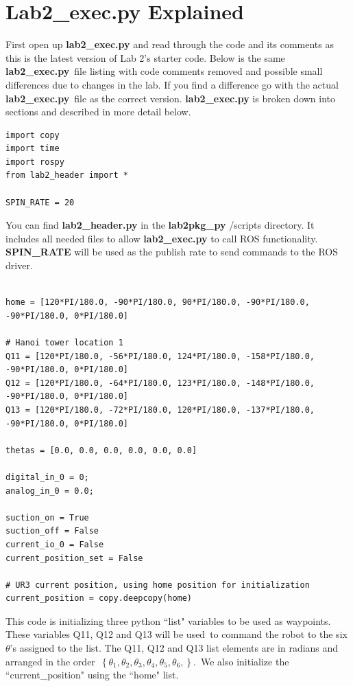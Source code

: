 \section{Lab2\_exec.py Explained}
First open up \textbf{lab2\_exec.py} and read through the code and its comments as this is the latest version of Lab 2's starter code. Below is the same \textbf{lab2\_exec.py}\
file listing with code comments removed and possible small differences due to changes in the lab.  If you find a difference go with the actual \textbf{lab2\_exec.py}\
file as the correct version.  \textbf{lab2\_exec.py} is broken down into sections and described in more detail below.  

{\footnotesize
\begin{verbatim}
import copy
import time
import rospy
from lab2_header import *

SPIN_RATE = 20
\end{verbatim}}

You can find \textbf{lab2\_header.py} in the \textbf{lab2pkg\_py} /scripts directory.  It includes all needed files to allow \textbf{lab2\_exec.py} to call ROS functionality.
\textbf{SPIN\_RATE} will be used as the publish rate to send commands to the ROS driver.  

{\footnotesize
\begin{verbatim}

home = [120*PI/180.0, -90*PI/180.0, 90*PI/180.0, -90*PI/180.0, -90*PI/180.0, 0*PI/180.0]

# Hanoi tower location 1
Q11 = [120*PI/180.0, -56*PI/180.0, 124*PI/180.0, -158*PI/180.0, -90*PI/180.0, 0*PI/180.0]
Q12 = [120*PI/180.0, -64*PI/180.0, 123*PI/180.0, -148*PI/180.0, -90*PI/180.0, 0*PI/180.0]
Q13 = [120*PI/180.0, -72*PI/180.0, 120*PI/180.0, -137*PI/180.0, -90*PI/180.0, 0*PI/180.0]

thetas = [0.0, 0.0, 0.0, 0.0, 0.0, 0.0]

digital_in_0 = 0;
analog_in_0 = 0.0;

suction_on = True
suction_off = False
current_io_0 = False
current_position_set = False

# UR3 current position, using home position for initialization
current_position = copy.deepcopy(home)

\end{verbatim}}

This code is initializing three python ``list" variables to be used as waypoints.  These variables Q11, Q12 and Q13 will be used\
to command the robot to the six $\theta$'s assigned to the list.  The Q11, Q12 and Q13 list elements are in radians and arranged in the order\
$\left\{\theta_1,\theta_2,\theta_3,\theta_4,\theta_5,\theta_6,\right\}$.\
We also initialize the ``current\_position" using the ``home" list. 

